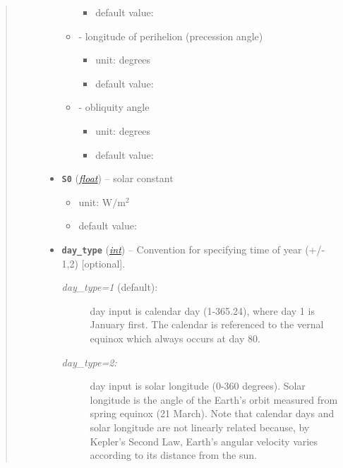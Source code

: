 \documentclass[a4paper,10pt,english]{sphinxmanual}
\begin{document}
\begin{fulllineitems}
\begin{quote}
\begin{description}
\begin{itemize}
\begin{itemize}
\begin{itemize}
\item {} 
default value: 

\end{itemize}

\item {} 
 - longitude of perihelion (precession angle)
\begin{itemize}
\item {} 
unit: degrees

\item {} 
default value: 

\end{itemize}

\item {} 
 - obliquity angle
\begin{itemize}
\item {} 
unit: degrees

\item {} 
default value: 

\end{itemize}

\end{itemize}


\item {} 
\textbf{\texttt{S0}} (\href{http://docs.python.org/2.7/library/functions.html\#float}{\emph{float}}) -- 
solar constant
\begin{itemize}
\item {} 
unit: \(\textrm{W}/\textrm{m}^2\)

\item {} 
default value: 

\end{itemize}


\item {} 
\textbf{\texttt{day\_type}} (\href{http://docs.python.org/2.7/library/functions.html\#int}{\emph{int}}) -- 
Convention for specifying time of year (+/- 1,2) {[}optional{]}.
\begin{description}
\item[{\emph{day\_type=1} (default):}] \leavevmode
day input is calendar day (1-365.24), where day 1
is January first. The calendar is referenced to the 
vernal equinox which always occurs at day 80.

\item[{\emph{day\_type=2:} }] \leavevmode
day input is solar longitude (0-360 degrees). Solar
longitude is the angle of the Earth's orbit measured from spring
equinox (21 March). Note that calendar days and solar longitude are
not linearly related because, by Kepler's Second Law, Earth's
angular velocity varies according to its distance from the sun.


\end{description}
\end{itemize}
\end{description}
\end{quote}
\end{fulllineitems}
\end{document}
